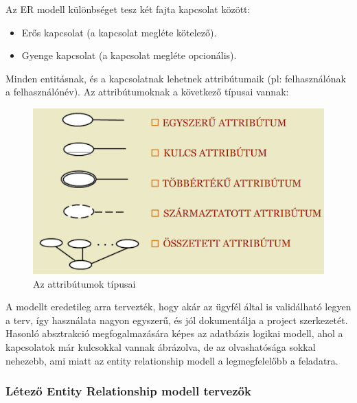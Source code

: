 \documentclass[a4paper,12pt,oneside]{report}
\begin{document}
\newpage
\begin{justify}
	Az ER modell különbséget tesz két fajta kapcsolat között:
    
    \begin{itemize}
        \item Erős kapcsolat (a kapcsolat megléte kötelező).
	    \item Gyenge kapcsolat (a kapcsolat megléte opcionális).
    \end{itemize}

	Minden entitásnak, és a kapcsolatnak lehetnek attribútumaik (pl: felhasználónak a felhasználónév). Az attribútumoknak a következő típusai vannak: 

	\begin{figure}[H]
		\includegraphics[width=\textwidth]{contents/images/ermodell_attributes.png}
		\caption{Az attribútumok típusai \cite{book:example_er_attr} }
		\label{fig:ermodell_attributes}
	\end{figure}

	A modellt eredetileg arra tervezték, hogy akár az ügyfél által is validálható legyen a terv, így használata nagyon egyszerű, és jól dokumentálja a project szerkezetét. Hasonló absztrakció megfogalmazására képes az adatbázis logikai modell, ahol a kapcsolatok már kulcsokkal vannak ábrázolva, de az olvashatósága sokkal nehezebb, ami miatt az entity relationship modell a legmegfelelőbb a feladatra. 

\end{justify}

\newpage
\subsubsection{Létező Entity Relationship modell tervezők}
\end{document}
